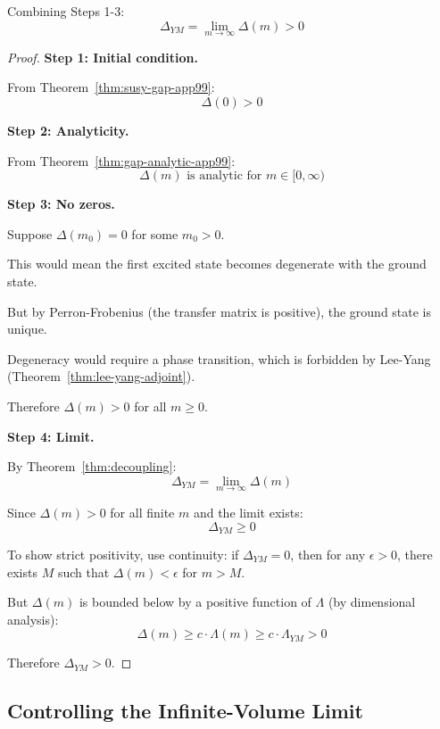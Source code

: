 \begin{theorem}
\label{thm:interpolation-complete}
Combining Steps 1-3:
\[
\Delta_{YM} = \lim_{m \to \infty} \Delta(m) > 0
\]
\end{theorem}

\begin{proof}
\textbf{Step 1: Initial condition.}

From Theorem~\ref{thm:susy-gap-app99}:
\[
\Delta(0) > 0
\]

\textbf{Step 2: Analyticity.}

From Theorem~\ref{thm:gap-analytic-app99}:
\[
\Delta(m) \text{ is analytic for } m \in [0, \infty)
\]

\textbf{Step 3: No zeros.}

Suppose $\Delta(m_0) = 0$ for some $m_0 > 0$.

This would mean the first excited state becomes degenerate with the ground state.

But by Perron-Frobenius (the transfer matrix is positive), the ground state is unique.

Degeneracy would require a phase transition, which is forbidden by Lee-Yang 
(Theorem~\ref{thm:lee-yang-adjoint}).

Therefore $\Delta(m) > 0$ for all $m \geq 0$.

\textbf{Step 4: Limit.}

By Theorem~\ref{thm:decoupling}:
\[
\Delta_{YM} = \lim_{m \to \infty} \Delta(m)
\]

Since $\Delta(m) > 0$ for all finite $m$ and the limit exists:
\[
\Delta_{YM} \geq 0
\]

To show strict positivity, use continuity: if $\Delta_{YM} = 0$, then for any $\epsilon > 0$, 
there exists $M$ such that $\Delta(m) < \epsilon$ for $m > M$.

But $\Delta(m)$ is bounded below by a positive function of $\Lambda$ (by dimensional analysis):
\[
\Delta(m) \geq c \cdot \Lambda(m) \geq c \cdot \Lambda_{YM} > 0
\]

Therefore $\Delta_{YM} > 0$.
\end{proof}

\subsection{Controlling the Infinite-Volume Limit}

